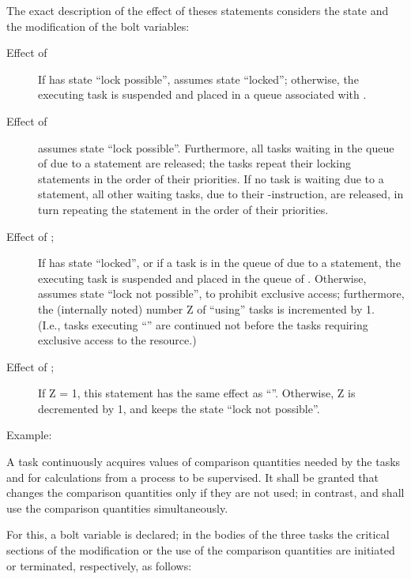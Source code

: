 The exact description of the effect of theses statements considers the
state and the modification of the bolt variables:
\begin{description}
\item[Effect of ]
If  has state ``lock possible'',  assumes state ``locked''; otherwise,
the executing task is suspended and placed in a queue associated with .
\item[Effect of ]
 assumes state ``lock possible''. Furthermore, all tasks waiting in the
queue of  due to a  statement are released; the tasks repeat
their locking statements in the order of their priorities. If no task
is waiting due to a  statement, all other waiting tasks, due to 
their -instruction, are released, in turn repeating the  
statement in the order of their priorities.
\item[Effect of ;]
If  has state ``locked'', or if a task is in the queue of  due to a
 statement, the executing task is suspended and placed in the
queue of . Otherwise,  assumes state ``lock not possible'', to prohibit
exclusive access; furthermore, the (internally noted) number Z of
``using'' tasks is incremented by 1.\\
(I.e., tasks executing ``'' are continued not before the tasks
requiring exclusive access to the resource.)
\item[Effect of ;]
If Z = 1, this statement has the same effect as ``''.
Otherwise, Z is decremented by 1, and  keeps the state ``lock not
possible''.
\end{description}

Example:

A task  continuously acquires values of comparison
quantities needed by the tasks  and  for
calculations from a process to be supervised. It shall be granted that
 changes the comparison quantities only if they are not
used; in contrast,  and  shall use the
comparison quantities simultaneously.

For this, a bolt variable  is declared; in the bodies of the three
tasks the critical sections of the modification or the use of the
comparison quantities are initiated or terminated, respectively, as
follows:

